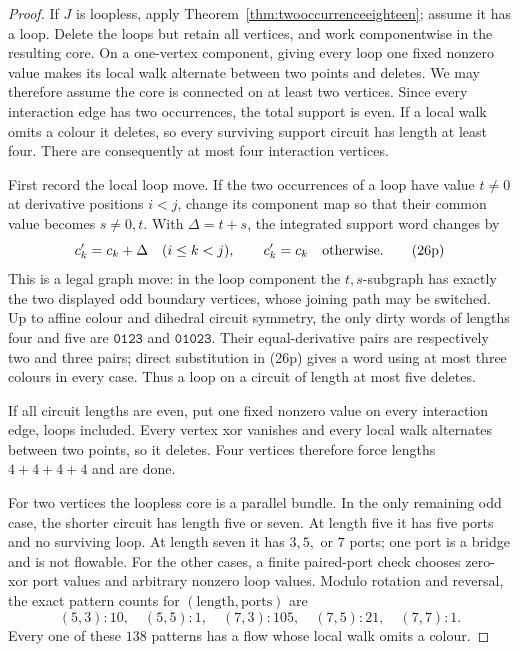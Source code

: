 \documentclass[11pt]{article}
\theoremstyle{definition}
\theoremstyle{remark}
\begin{document}
\begin{proof}
If \(J\) is loopless, apply
Theorem~\ref{thm:twooccurrenceeighteen}; assume it has a loop.  Delete
the loops but retain all vertices, and work componentwise in the
resulting core.  On a one-vertex component, giving every loop one fixed
nonzero value makes its local walk alternate between two points and
deletes.  We may therefore assume the core is connected on at least two
vertices.  Since every interaction edge has two occurrences, the total
support is even.  If a local walk omits a colour it deletes, so every
surviving support circuit has length at least four.  There are
consequently at most four interaction vertices.

First record the local loop move.  If the two occurrences of a loop have
value \(t\ne0\) at derivative positions \(i<j\), change its component
map so that their common value becomes \(s\ne0,t\).  With
\(\Delta=t+s\), the integrated support word changes by
\[
 c'_k=c_k+\Delta\quad(i\le k<j),\qquad c'_k=c_k
 \quad\hbox{otherwise}.                                  \tag{26p}
\]
This is a legal graph move: in the loop component the \(t,s\)-subgraph
has exactly the two displayed odd boundary vertices, whose joining path
may be switched.  Up to affine colour and dihedral circuit symmetry,
the only dirty words of lengths four and five are
\(\texttt{0123}\) and \(\texttt{01023}\).  Their equal-derivative pairs
are respectively two and three pairs; direct substitution in (26p)
gives a word using at most three colours in every case.  Thus a loop on
a circuit of length at most five deletes.

If all circuit lengths are even, put one fixed nonzero value on every
interaction edge, loops included.  Every vertex xor vanishes and every
local walk alternates between two points, so it deletes.  Four vertices
therefore force lengths \(4+4+4+4\) and are done.

For two vertices the loopless core is a parallel bundle.  In the only
remaining odd case, the shorter circuit has length five or seven.  At
length five it has five ports and no surviving loop.  At length seven
it has \(3,5,\) or \(7\) ports; one port is a bridge and is not flowable.
For the other cases, a finite paired-port check chooses zero-xor port
values and arbitrary nonzero loop values.  Modulo rotation and reversal,
the exact pattern counts for \((\text{length},\text{ports})\) are
\[
 (5,3):10,\quad(5,5):1,\quad
 (7,3):105,\quad(7,5):21,\quad(7,7):1.                  \tag{26q}
\]
Every one of these \(138\) patterns has a flow whose local walk omits a
colour.


\end{proof}
\end{document}
